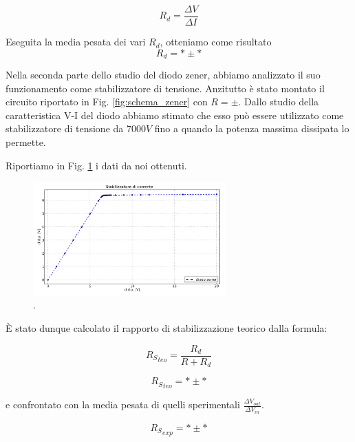 \begin{equation}
R_d=\frac{\Delta V}{\Delta I}
\label{scemopagliaccio}
\end{equation}

Eseguita la media pesata dei vari $R_d$, otteniamo come risultato
$$R_d= * \pm *$$

Nella seconda parte dello studio del diodo zener, abbiamo analizzato il suo funzionamento come stabilizzatore di tensione. Anzitutto è stato montato il circuito riportato in Fig. \ref{fig:schema_zener} con $R= \pm $.  Dallo studio della caratteristica V-I del diodo abbiamo stimato che esso può essere utilizzato come stabilizzatore di tensione da $7000 V$ fino a quando la potenza massima dissipata lo permette. 

Riportiamo in Fig. \ref{fig:stabilizer} i dati da noi ottenuti.

\begin{figure}[h]
\center
	\includegraphics[width=0.66\textwidth]{stabilizer.pdf}
	\caption{.}
	\label{fig:stabilizer}
\end{figure}

\`E stato dunque calcolato il rapporto di stabilizzazione teorico dalla formula: 

\begin{equation}
{R_S}_{teo}=\frac{R_d}{R+R_d}
\label{RS_teo}
\end{equation}

$${R_S}_{teo}= * \pm *$$

e confrontato con la media pesata di quelli sperimentali $\frac{\Delta V_{out}}{\Delta V_{in}}$.

$${R_S}_{exp}= * \pm *$$
 